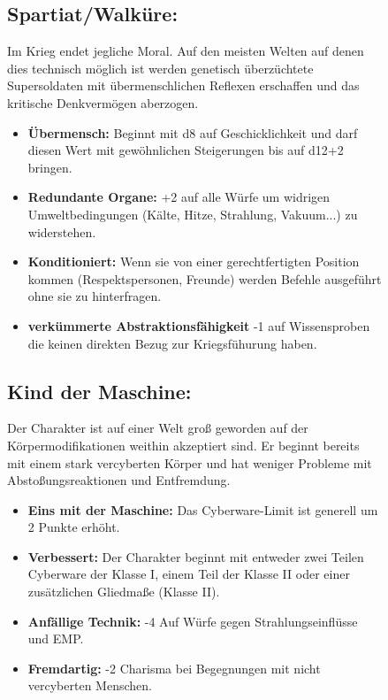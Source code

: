 \documentclass[10pt,a4paper]{report}
\begin{document}
\begin{figure}[h!]
\subsection*{Spartiat/Walküre:} Im Krieg endet jegliche Moral. Auf den meisten Welten auf denen dies technisch möglich ist werden genetisch überzüchtete Supersoldaten mit übermenschlichen Reflexen erschaffen und das  kritische Denkvermögen aberzogen.
\begin{itemize}
\item \textbf{Übermensch:} Beginnt mit d8 auf Geschicklichkeit und darf diesen Wert mit gewöhnlichen Steigerungen bis auf d12+2 bringen.
\item \textbf{Redundante Organe:} +2 auf alle Würfe um widrigen Umweltbedingungen (Kälte, Hitze, Strahlung, Vakuum...) zu widerstehen.
\item \textbf{Konditioniert:} Wenn sie von einer gerechtfertigten Position kommen (Respektspersonen, Freunde) werden Befehle ausgeführt ohne sie zu hinterfragen.
\item \textbf{verkümmerte Abstraktionsfähigkeit} -1 auf Wissensproben die keinen direkten Bezug zur Kriegsfühurung haben.
\end{itemize}
\end{figure}

\begin{figure}[h!]
\subsection*{Kind der Maschine:} Der Charakter ist auf einer Welt groß geworden auf der Körpermodifikationen weithin akzeptiert sind. Er beginnt bereits mit einem stark vercyberten Körper und hat weniger Probleme mit Abstoßungsreaktionen und Entfremdung.
\begin{itemize}
\item \textbf{Eins mit der Maschine:} Das Cyberware-Limit ist generell um 2 Punkte erhöht.
\item \textbf{Verbessert:} Der Charakter beginnt mit entweder zwei Teilen Cyberware der Klasse I, einem Teil der Klasse II oder einer zusätzlichen Gliedmaße (Klasse II).
\item \textbf{Anfällige Technik:} -4 Auf Würfe gegen Strahlungseinflüsse und EMP.
\item \textbf{Fremdartig:} -2 Charisma bei Begegnungen mit nicht vercyberten Menschen.
\end{itemize}
\end{figure}
\end{document}
